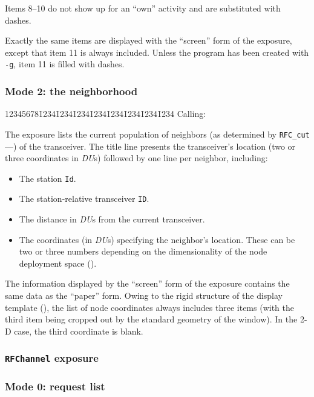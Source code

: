 Items 8--10 do not show up for an ``own'' activity and are substituted with
dashes.

Exactly the same items are displayed with the ``screen''
form of the exposure, except that item 11 is always included.
Unless the program has been created with {\tt -g}, item 11 is filled
with dashes.

\subsubsection*{Mode 2: the neighborhood}

{\tt\begin{tabbing}
12345678\=1234\=1234\=1234\=1234\=1234\=1234\=1234\=1234\kill
{\rm Calling:}
\end{tabbing}}

The exposure lists the current population of neighbors (as determined by
{\tt RFC\_cut}---) of the transceiver.
The title line presents the transceiver's location (two or three
coordinates in {\em DU\/}s) followed by one line per neighbor, including:

\begin{itemize}
\item
The station {\tt Id}.
\item
The station-relative transceiver {\tt ID}.
\item 
The distance in {\em DU\/}s from the current transceiver.
\item
The coordinates (in {\em DU\/}s) specifying the neighbor's location.
These can be two or three numbers depending on the dimensionality of the
node deployment space ().
\end{itemize}

The information displayed by the ``screen'' form of the exposure contains the
same data as the ``paper'' form.
Owing to the rigid structure of the display template (), the
list of node coordinates always includes three items (with the third item
being cropped out by the standard geometry of the window).
In the 2-D case, the third coordinate is blank.

\subsubsection{{\tt RFChannel} exposure}
\label{rm_ex_se_rc}

\subsubsection*{Mode 0: request list}

